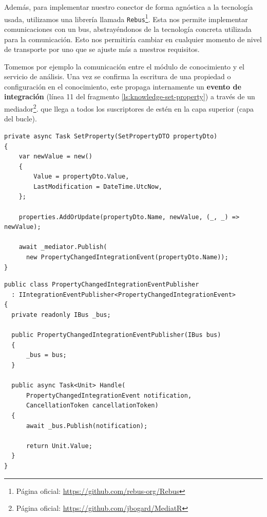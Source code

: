 Además, para implementar nuestro conector de forma agnóstica a la tecnología usada, utilizamos una librería llamada \texttt{Rebus}\footnote{Página oficial: \url{https://github.com/rebus-org/Rebus}}. Esta nos permite implementar comunicaciones con un bus, abstrayéndonos de la tecnología concreta utilizada para la comunicación. Esto nos permitiría cambiar en cualquier momento de nivel de transporte por uno que se ajuste más a nuestros requisitos.

Tomemos por ejemplo la comunicación entre el módulo de conocimiento y el servicio de análisis. Una vez se confirma la escritura de una propiedad o configuración en el conocimiento, este propaga internamente un \textbf{evento de integración} (línea 11 del fragmento \ref{ls:knowledge-set-property}) a través de un mediador\footnote{Página oficial: \url{https://github.com/jbogard/MediatR}}. que llega a todos los suscriptores de estén en la capa superior (capa del bucle).


\begin{lstlisting}[language={[Sharp]C},caption={Implementación del método que asigna valor a una propiedad. Muestra un ejemplo de propagación interna de eventos de integración.},captionpos=b, label=ls:knowledge-set-property]
private async Task SetProperty(SetPropertyDTO propertyDto)
{
    var newValue = new()
    {
        Value = propertyDto.Value,
        LastModification = DateTime.UtcNow,
    };

    properties.AddOrUpdate(propertyDto.Name, newValue, (_, _) => newValue);

    await _mediator.Publish(
      new PropertyChangedIntegrationEvent(propertyDto.Name));
}

\end{lstlisting}

\begin{lstlisting}[language={[Sharp]C},caption={El publicador de eventos captura el evento de integración que se propaga internamente, y lo publica en el bus.},captionpos=b, label=ls:knowledge-set-property]
public class PropertyChangedIntegrationEventPublisher
  : IIntegrationEventPublisher<PropertyChangedIntegrationEvent>
{
  private readonly IBus _bus;

  public PropertyChangedIntegrationEventPublisher(IBus bus)
  {
      _bus = bus;
  }

  public async Task<Unit> Handle(
      PropertyChangedIntegrationEvent notification,
      CancellationToken cancellationToken)
  {
      await _bus.Publish(notification);

      return Unit.Value;
  }
}
\end{lstlisting}

